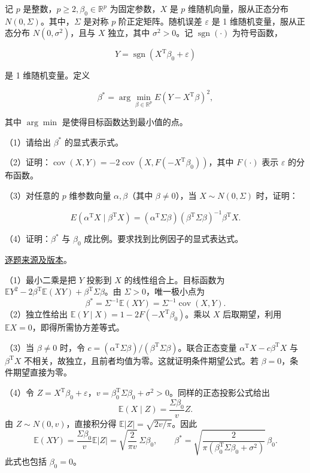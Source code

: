 \documentclass[UTF8,12pt,a4paper,fontset=fandol]{ctexbook}
\begin{document}
\begin{example}[公开题解转录]\label{q:fin13-high:12}

记 $p$ 是整数，$p \geq 2, \beta_0\in\mathbb R^p$ 为固定参数，$X$ 是 $p$ 维随机向量，服从正态分布 $N(0, \Sigma)$。其中，$\Sigma$ 是对称 $p$ 阶正定矩阵。随机误差 $\varepsilon$ 是 1 维随机变量，服从正态分布 $N(0, \sigma^2)$，且与 $X$ 独立，其中 $\sigma^2 > 0$。记 $\operatorname{sgn}(\cdot)$ 为符号函数，

\[
Y = \operatorname{sgn}\left(X^{\mathrm{T}}\beta_0 + \varepsilon\right)
\]

是 1 维随机变量。定义

\[
\beta^* = \operatorname*{arg}\min_{\beta \in \mathbb{R}^p} E\left(Y - X^{\mathrm{T}}\beta\right)^2,
\]

其中 $\operatorname{arg}\min$ 是使得目标函数达到最小值的点。

（1）请给出 $\beta^*$ 的显式表示式。

（2）证明：$\operatorname{cov}(X, Y) = -2 \operatorname{cov}\left(X, F\left(-X^{\mathrm{T}}\beta_0\right)\right)$，其中 $F(\cdot)$ 表示 $\varepsilon$ 的分布函数。

（3）对任意的 $p$ 维参数向量 $\alpha, \beta$（其中 $\beta\ne0$），当 $X \sim N(0, \Sigma)$ 时，证明：

\[
E\left(\alpha^{\mathrm{T}}X \mid \beta^{\mathrm{T}}X\right) = \left(\alpha^{\mathrm{T}}\Sigma\beta\right)\left(\beta^{\mathrm{T}}\Sigma\beta\right)^{-1}\beta^{\mathrm{T}}X.
\]

（4）证明：$\beta^*$ 与 $\beta_0$ 成比例。要求找到比例因子的显式表达式。

\end{example}

\href{https://github.com/lzxcr/cmc-mathematics/blob/64916fa1fdbc3e444a652eca204d5669058ee321/src/problems/finals/13/15.md}{逐题来源及版本}。

\begin{solve}

（1）最小二乘是把 $Y$ 投影到 $X$ 的线性组合上。目标函数为 $\mathbb EY^2-2\beta^{\mathrm T}\mathbb E(XY)+\beta^{\mathrm T}\Sigma\beta$。由 $\Sigma>0$，唯一极小点为
\[
\beta^*=\Sigma^{-1}\mathbb E(XY)=\Sigma^{-1}\operatorname{cov}(X,Y).
\]
（2）独立性给出 $\mathbb E(Y\mid X)=1-2F(-X^{\mathrm T}\beta_0)$。乘以 $X$ 后取期望，利用 $\mathbb EX=0$，即得所需协方差等式。

（3）当 $\beta\ne0$ 时，令 $c=(\alpha^{\mathrm T}\Sigma\beta)/(\beta^{\mathrm T}\Sigma\beta)$。联合正态变量 $\alpha^{\mathrm T}X-c\beta^{\mathrm T}X$ 与 $\beta^{\mathrm T}X$ 不相关，故独立，且前者均值为零。这就证明条件期望公式。若 $\beta=0$，条件期望直接为零。

（4）令 $Z=X^{\mathrm T}\beta_0+\varepsilon$，$v=\beta_0^{\mathrm T}\Sigma\beta_0+\sigma^2>0$。同样的正态投影公式给出
\[
\mathbb E(X\mid Z)=\frac{\Sigma\beta_0}{v}Z.
\]
由 $Z\sim N(0,v)$，直接积分得 $\mathbb E|Z|=\sqrt{2v/\pi}$。因此
\[
\mathbb E(XY)=\frac{\Sigma\beta_0}{v}\mathbb E|Z|
=\sqrt{\frac2{\pi v}}\,\Sigma\beta_0,
\qquad
\boxed{\beta^*=\sqrt{\frac2{\pi(\beta_0^{\mathrm T}\Sigma\beta_0+\sigma^2)}}\,\beta_0}.
\]
此式也包括 $\beta_0=0$。

\end{solve}
\end{document}
